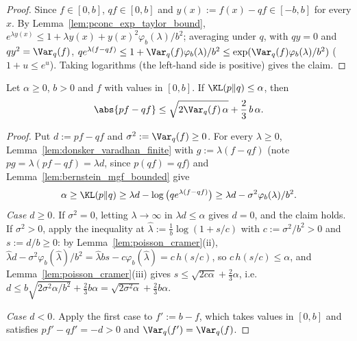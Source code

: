 \begin{proof}
\leanok
Since $f \in [0, b]$, $qf \in [0, b]$ and $y(x) := f(x) - qf \in [-b, b]$ for every $x$. By
Lemma~\ref{lem:pconc_exp_taylor_bound}, $e^{\lambda y(x)} \le 1 + \lambda y(x) + y(x)^2 \varphi_b(\lambda)/b^2$;
averaging under $q$, with $q y = 0$ and $q y^2 = \Var_q(f)$,
$q e^{\lambda(f - qf)} \le 1 + \Var_q(f)\varphi_b(\lambda)/b^2 \le \exp(\Var_q(f)\varphi_b(\lambda)/b^2)$
($1 + u \le e^u$). Taking logarithms (the left-hand side is positive) gives the claim.
\end{proof}

\begin{lemma}\label{lem:kl_bernstein}
\leanok
Let $\alpha \ge 0$, $b > 0$ and $f$ with values in $[0, b]$. If $\KL(p \| q) \le \alpha$, then
\[
  \abs{pf - qf} \le \sqrt{2 \Var_q(f)\, \alpha} + \frac23\, b\, \alpha .
\]
\end{lemma}

\begin{proof}
\leanok
Put $d := pf - qf$ and $\sigma^2 := \Var_q(f) \ge 0$. For every $\lambda \ge 0$,
Lemma~\ref{lem:donsker_varadhan_finite} with $g := \lambda(f - qf)$ (note
$pg = \lambda(pf - qf) = \lambda d$, since $p(qf) = qf$) and Lemma~\ref{lem:bernstein_mgf_bounded} give
\[
  \alpha \ge \KL(p \| q) \ge \lambda d - \log\big(q e^{\lambda(f - qf)}\big) \ge \lambda d - \sigma^2 \varphi_b(\lambda)/b^2 .
\]
\emph{Case $d \ge 0$.} If $\sigma^2 = 0$, letting $\lambda \to \infty$ in $\lambda d \le \alpha$ gives
$d = 0$, and the claim holds. If $\sigma^2 > 0$, apply the inequality at
$\hat\lambda := \frac1b \log(1 + s/c)$ with $c := \sigma^2/b^2 > 0$ and $s := d/b \ge 0$:
by Lemma~\ref{lem:poisson_cramer}(ii), $\hat\lambda d - \sigma^2\varphi_b(\hat\lambda)/b^2 = \hat\lambda b s - c\varphi_b(\hat\lambda) = c\, h(s/c)$,
so $c\, h(s/c) \le \alpha$, and Lemma~\ref{lem:poisson_cramer}(iii) gives
$s \le \sqrt{2c\alpha} + \frac23\alpha$, i.e.\ $d \le b\sqrt{2\sigma^2\alpha/b^2} + \frac23 b\alpha = \sqrt{2\sigma^2\alpha} + \frac23 b\alpha$.

\emph{Case $d < 0$.} Apply the first case to $f' := b - f$, which takes values in $[0, b]$ and
satisfies $pf' - qf' = -d > 0$ and $\Var_q(f') = \Var_q(f)$.
\end{proof}

